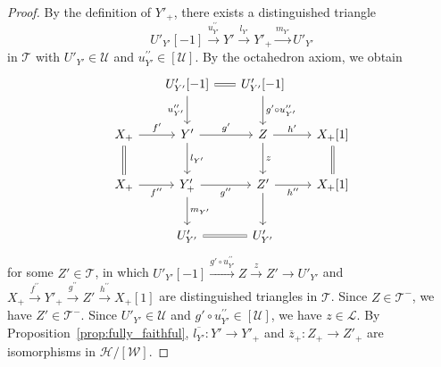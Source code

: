 \documentclass[a4paper,reqno,10pt]{amsart}
\theoremstyle{definition}
\theoremstyle{definition}
\theoremstyle{definition}
\theoremstyle{definition}
\theoremstyle{plain}
\newcommand{\CH}{\mathcal{H}}
\newcommand{\CL}{\mathcal{L}}
\newcommand{\CT}{\mathcal{T}}
\newcommand{\CU}{\mathcal{U}}
\newcommand{\CW}{\mathcal{W}}
\begin{document}
\begin{proof}
By the definition of $Y'_+$, there exists a distinguished triangle
\[ U'_{Y'}[-1]\xrightarrow{u_{Y'}^{\prime\prime}}Y'\xrightarrow{l_{Y'}}Y'_+\xrightarrow{m_{Y'}}U'_{Y'} \]
in $\CT$ with  $U'_{Y'}\in\CU$ and $u_{Y'}^{\prime\prime}\in [\CU]$.
By the octahedron axiom, we obtain
\begin{equation}\label{octa:Y'+}
\begin{tikzcd}[row sep=0.8cm, column sep=0.6cm]
{}
&U'_{Y'}[-1]\arrow{d}[swap]{u_{Y'}^{\prime\prime}}\arrow[equal]{r}{}
&U'_{Y'}[-1] \arrow{d}{g'\circ u_{Y'}^{\prime\prime}}
\\
X_+ \arrow{r}{f'}\arrow[equal]{d}{}
&Y' \arrow{d}{l_{Y'}} \arrow{r}{g'}
&Z \arrow{r}{h'} \arrow{d}{z}
&X_+[1] \arrow[equal]{d}{}
\\
X_+\arrow{r}[swap]{f^{\prime\prime}}
&Y'_+ \arrow{d}{m_{Y'}} \arrow{r}[swap]{g^{\prime\prime}}
&Z'\arrow{r}[swap]{h^{\prime\prime}}\arrow{d}{}
&X_+[1]
\\
{}
&U'_{Y'} \arrow[equal]{r}
&U'_{Y'}
\end{tikzcd}
\end{equation}
for some $Z'\in\CT$, in which $U'_{Y'}[-1]\xrightarrow{g'\circ u_{Y'}^{\prime\prime}}Z\xrightarrow{z}Z'\to U'_{Y'}$ and
$X_+\xrightarrow{f^{\prime\prime}}Y'_+\xrightarrow{g^{\prime\prime}}Z'\xrightarrow{h^{\prime\prime}}X_+[1]$ are distinguished triangles in $\CT$.
Since $Z\in\CT^-$, we have $Z'\in\CT^-$. Since $U'_{Y'}\in\CU$ and $g'\circ u^{\prime\prime}_{Y'}\in[\CU]$, we have $z\in \CL$. By Proposition~\ref{prop:fully_faithful}, 
\color{blue}
$\overline{l_{Y'}}\colon Y'\to Y'_+$ 
\normalcolor 
and $\overline{z}_+\colon Z_+\to Z'_+$ are isomorphisms in $\CH/[\CW]$. 


\end{proof}
\end{document}
